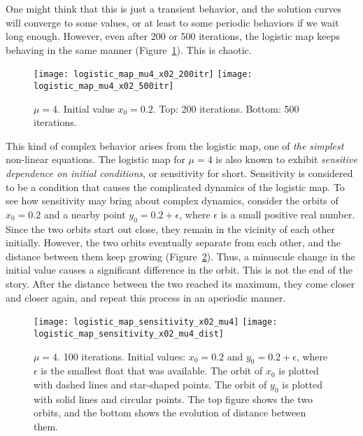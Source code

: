 \documentclass[10pt,twoside,draft]{book}
\begin{document}
One might think that this is just a transient behavior, and the solution curves will converge to some values, or at least to some periodic behaviors if we wait long enough.
However, even after 200 or 500 iterations, the logistic map keeps behaving in the same manner (Figure~\ref{fig:chaotic_map}).
This is chaotic.
\begin{figure}[p]
  \centering
  \texttt{[image: logistic\_map\_mu4\_x02\_200itr]}
  \texttt{[image: logistic\_map\_mu4\_x02\_500itr]}
  \caption{
    $\mu = 4$. Initial value $x_0 = 0.2$.
    Top: 200 iterations. Bottom: 500 iterations.
  }
  \label{fig:chaotic_map}
\end{figure}

This kind of complex behavior arises from the logistic map, one of \textit{the simplest} non-linear equations.
The logistic map for $\mu = 4$ is also known to exhibit \textit{sensitive dependence on initial conditions}, or sensitivity for short.
Sensitivity is considered to be a condition that causes the complicated dynamics of the logistic map.
To see how sensitivity may bring about complex dynamics, consider the orbits of $x_0 = 0.2$ and a nearby point $y_0 = 0.2 + \epsilon$, where $\epsilon$ is a small positive real number.
Since the two orbits start out close, they remain in the vicinity of each other initially.
However, the two orbits eventually separate from each other, and the distance between them keep growing (Figure~\ref{fig:logistic_sensitivity}).
Thus, a minuscule change in the initial value causes a significant difference in the orbit.
This is not the end of the story.
After the distance between the two reached its maximum, they come closer and closer again, and repeat this process in an aperiodic manner.
\begin{figure}[p]
  \centering
  \texttt{[image: logistic\_map\_sensitivity\_x02\_mu4]}
  \texttt{[image: logistic\_map\_sensitivity\_x02\_mu4\_dist]}
  \caption{
    $\mu = 4$. 100 iterations.
    Initial values: $x_0 = 0.2$ and $y_0 = 0.2 + \epsilon$, where $\epsilon$ is the smallest float that was available.
    The orbit of $x_0$ is plotted with dashed lines and star-shaped points.
    The orbit of $y_0$ is plotted with solid lines and circular points.
    The top figure shows the two orbits, and the bottom shows the evolution of distance between them.
  }
  \label{fig:logistic_sensitivity}
\end{figure}
\end{document}
